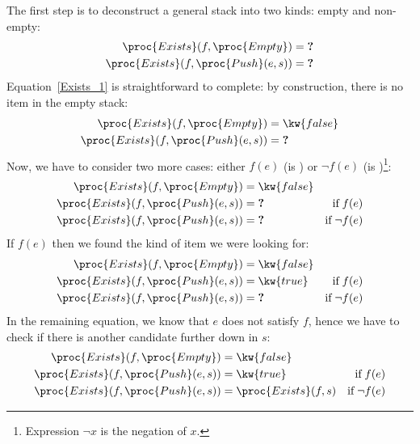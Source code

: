   The first step is to deconstruct a general stack into two kinds:
  empty and non-empty:
  \begin{align}
      \proc{Exists} (f, \proc{Empty})
   &= \textbf{?} \label{Exists_1}\\
      \proc{Exists} (f, \proc{Push} (e, s))
   &= \textbf{?} \label{Exists_2}
  \end{align}
  Equation~\ref{Exists_1} is straightforward to complete: by
  construction, there is no item in the empty stack:
  \begin{align*}
      \proc{Exists} (f, \proc{Empty})
   &= \kw{false}\\
      \proc{Exists} (f, \proc{Push} (e, s))
   &= \textbf{?}
  \end{align*}
  Now, we have to consider two more cases: either \(f(e)\)
  (is ) or \(\neg{f (e)}\) (is
  )\footnote{Expression \(\neg{x}\) is the negation of
    \(x\).}:
  \begin{align*}
      \proc{Exists} (f, \proc{Empty})
   &= \kw{false}\\
      \proc{Exists} (f, \proc{Push} (e, s))
   &= \textbf{?} & \text{if} \;f(e)\\
      \proc{Exists} (f, \proc{Push} (e, s))
   &= \textbf{?} & \text{if} \;\neg{f(e)}
  \end{align*}
  If \(f(e)\) then we found the kind of item we were looking
  for:
  \begin{align*}
      \proc{Exists} (f, \proc{Empty})
   &= \kw{false}\\
      \proc{Exists} (f, \proc{Push} (e, s))
   &= \kw{true} & \text{if} \;f(e)\\
      \proc{Exists} (f, \proc{Push} (e, s))
   &= \textbf{?} & \text{if} \;\neg{f(e)}
  \end{align*}
  In the remaining equation, we know that \(e\) does not satisfy
  \(f\), hence we have to check if there is another candidate further
  down in \(s\):
  \begin{align*}
      \proc{Exists} (f, \proc{Empty})
   &= \kw{false}\\
      \proc{Exists} (f, \proc{Push} (e, s))
   &= \kw{true} & \text{if} \;f(e)\\
      \proc{Exists} (f, \proc{Push} (e, s))
   &= \proc{Exists} (f, s) & \text{if} \;\neg{f(e)}
  \end{align*}  

